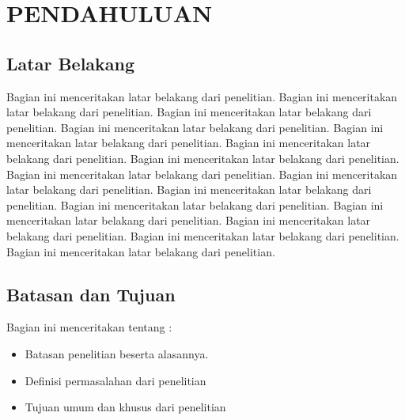 
\chapter{PENDAHULUAN}
\label{cha:1-Pendahuluan}

\section{Latar Belakang}
\label{sec:1-LatarBelakang}

Bagian ini menceritakan latar belakang dari penelitian.
Bagian ini menceritakan latar belakang dari penelitian.
Bagian ini menceritakan latar belakang dari penelitian.
Bagian ini menceritakan latar belakang dari penelitian.
Bagian ini menceritakan latar belakang dari penelitian.
Bagian ini menceritakan latar belakang dari penelitian.
Bagian ini menceritakan latar belakang dari penelitian.
Bagian ini menceritakan latar belakang dari penelitian.
Bagian ini menceritakan latar belakang dari penelitian.
Bagian ini menceritakan latar belakang dari penelitian.
Bagian ini menceritakan latar belakang dari penelitian.
Bagian ini menceritakan latar belakang dari penelitian.
Bagian ini menceritakan latar belakang dari penelitian.
Bagian ini menceritakan latar belakang dari penelitian.
Bagian ini menceritakan latar belakang dari penelitian.


\section{Batasan dan Tujuan}
\label{sec:1-BatasTujuan}

Bagian ini menceritakan tentang :
\begin{itemize}
\item Batasan penelitian beserta alasannya.
\item Definisi permasalahan dari penelitian
\item Tujuan umum dan khusus dari penelitian
\end{itemize}

